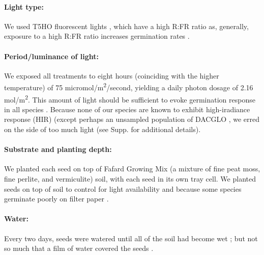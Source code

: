 \documentclass[12pt]{article}\usepackage[]{graphicx}\usepackage[]{color}
\begin{document}
	\paragraph{Light type:} We used T5HO fluorescent lights \parencite{Toole1963}, which have a high R:FR ratio as, generally, exposure to a high R:FR ratio increases germination rates \parencite[though across studies, some find successful germination requires high R:FR ratio or no effect][]{Popay1970,Pons2000,Wulff1994}. %
	
	\paragraph{Period/luminance of light:} We exposed all treatments to eight hours (coinciding with the higher temperature\parencite{Baskin1998}) of 75 micromol/m\textsuperscript{2}/second, yielding a daily photon dosage of 2.16 mol/m\textsuperscript{2}. This amount of light should be sufficient to evoke germination response in all species \parencite{Pons1991}. Because none of our species are known to exhibit high-iradiance response (HIR) (except perhaps an unsampled population of DACGLO \parencite{Probert1986}, we erred on the side of too much light (see Supp. for additional details). 
	
	\paragraph{Substrate and planting depth:} We planted each seed on top of Fafard Growing Mix (a mixture of fine peat moss, fine perlite, and vermiculite) soil, with each seed in its own tray cell. We planted seeds on top of soil to control for light availability \parencite{Tester1987} and because some species germinate poorly on filter paper \parencite{Andrews1974}.
	
	\paragraph{Water:} Every two days, seeds were watered until all of the soil had become wet \parencite{Steinbauer1957}; but not so much that a film of water covered the seeds \parencite{AOSA1960}.
	
\end{document}
